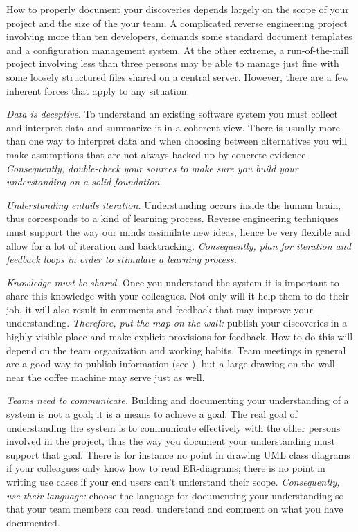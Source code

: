 \documentclass[a4paper,10pt,twoside]{book}
\begin{document}
How to properly document your discoveries depends largely on the scope of your project and 
the size of the your team. A complicated reverse engineering project involving more than 
ten developers, demands some standard document templates and a configuration management 
system. At the other extreme, a run-of-the-mill project involving less than three persons 
may be able to manage just fine with some loosely structured files shared on a central 
server. However, there are a few inherent forces that apply to any situation.

\begin{bulletlist}
\item \emph{Data is deceptive.}
To understand an existing software system you must collect and interpret data and summarize 
it in a coherent view. There is usually more than one way to interpret data and when 
choosing between alternatives you will make assumptions that are not always backed up by 
concrete evidence. \emph{Consequently, double-check your sources to make sure you build 
your understanding on a solid foundation.}

\item \emph{Understanding entails iteration.}
Understanding occurs inside the human brain, thus corresponds to a kind of learning 
process. Reverse engineering techniques must support the way our minds assimilate new 
ideas, hence be very flexible and allow for a lot of iteration and backtracking. 
\emph{Consequently, plan for iteration and feedback loops in order to stimulate a learning 
process.}

\item \emph{Knowledge must be shared.}
Once you understand the system it is important to share this knowledge with your 
colleagues. Not only will it help them to do their job, it will also result in comments and 
feedback that may improve your understanding. \emph{Therefore, put the map on the wall:} 
publish your discoveries in a highly visible place and make explicit provisions for 
feedback. How to do this will depend on the team organization and working habits. Team 
meetings in general are a good way to publish information (see ), but a large drawing on the wall near the coffee machine may 
serve just as well.

\item \emph{Teams need to communicate.}
Building and documenting your understanding of a system is not a goal; it is a means to 
achieve a goal. The real goal of understanding the system is to communicate effectively 
with the other persons involved in the project, thus the way you document your 
understanding must support that goal. There is for instance no point in drawing UML class 
diagrams if your colleagues only know how to read ER-diagrams; there is no point in writing 
use cases if your end users can't understand their scope. \emph{Consequently, use their 
language:} choose the language for documenting your understanding so that your team members 
can read, understand and comment on what you have documented.
\end{bulletlist}
\end{document}
